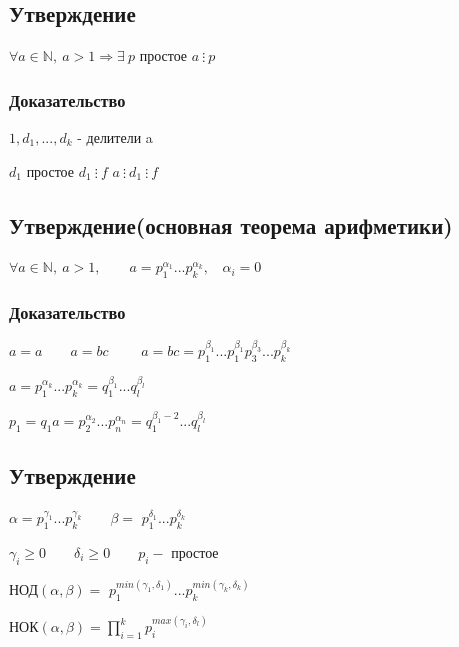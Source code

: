 \documentclass[12pt]{article}
\begin{document}
\subsection{Утверждение}
$\forall a \in \mathbb{N},\ a > 1 \Rightarrow \exists \ p$ простое $a\ \vdots \ p$
\subsubsection{Доказательство}
$1,d_1,..., d_k$ - делители a \par
$d_1$ простое $d_1 \ \vdots \ f$ \qquad $a \ \vdots \ d_1 \ \vdots \ f$ \par
\subsection{Утверждение(основная теорема арифметики)}
$\forall a \in \mathbb{N}, \ a>1, \qquad a = p_1^{\alpha_1} ... p_k^{\alpha_k}, \ \ \ \ \alpha_i = 0$
\subsubsection{Доказательство}
$a = a \qquad a=bc \qquad$ $a=bc=p_1^{\beta_1}...p_1^{\beta_1}p_3^{\beta_3}...p_k^{\beta_k}$ \par $a=p_1^{\alpha_k}...p_k^{\alpha_k} = q_1^{\beta_1}...q_l^{\beta_l}$ \par
$p_1 = q_1a=p_2^{\alpha_2}...p_n^{\alpha_n}=q_1^{\beta_1-2}...q_l^{\beta_l}$
\subsection{Утверждение}
$\alpha=p_1^{\gamma_1}...p_k^{\gamma_k} \qquad \beta=$ $p_1^{\delta_1}...p_k^{\delta_k}$\par
$\gamma_i \geq 0 \qquad \delta_i \geq 0 \qquad p_i -$ простое \par
НОД$(\alpha, \beta) =$
$ p_1^{min(\gamma_1, \delta_1)}...p_k^{min(\gamma_k, \delta_k)}$ \par
НОК$(\alpha, \beta)=\prod_{i=1}^kp_i^{max(\gamma_i, \delta_l)}$
\end{document}
